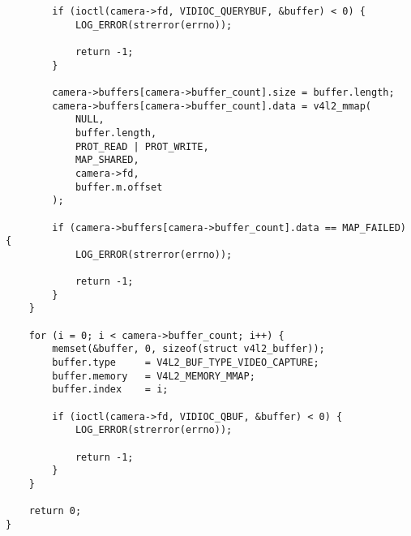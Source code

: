 \begin{verbatim}
        if (ioctl(camera->fd, VIDIOC_QUERYBUF, &buffer) < 0) {
            LOG_ERROR(strerror(errno));

            return -1;
        }

        camera->buffers[camera->buffer_count].size = buffer.length;
        camera->buffers[camera->buffer_count].data = v4l2_mmap(
            NULL,
            buffer.length,
            PROT_READ | PROT_WRITE,
            MAP_SHARED,
            camera->fd,
            buffer.m.offset
        );

        if (camera->buffers[camera->buffer_count].data == MAP_FAILED) {
            LOG_ERROR(strerror(errno));

            return -1;
        }
    }

    for (i = 0; i < camera->buffer_count; i++) {
        memset(&buffer, 0, sizeof(struct v4l2_buffer));
        buffer.type     = V4L2_BUF_TYPE_VIDEO_CAPTURE;
        buffer.memory   = V4L2_MEMORY_MMAP;
        buffer.index    = i;

        if (ioctl(camera->fd, VIDIOC_QBUF, &buffer) < 0) {
            LOG_ERROR(strerror(errno));

            return -1;
        }
    }

    return 0;
}
\end{verbatim}
